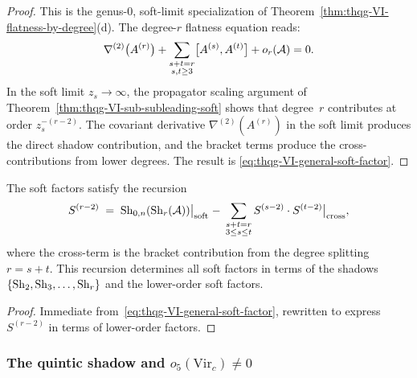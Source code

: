 \begin{proof}
This is the genus-$0$, soft-limit specialization of
Theorem~\ref{thm:thqg-VI-flatness-by-degree}(d). The degree-$r$
flatness equation reads:
\[
\nabla^{(2)}\bigl(A^{(r)}\bigr)
+ \sum_{\substack{s+t=r \\ s,t \geq 3}}
\bigl[A^{(s)}, A^{(t)}\bigr]
+ o_r(\mathcal{A})
= 0.
\]
In the soft limit $z_s \to \infty$, the propagator scaling argument
of Theorem~\ref{thm:thqg-VI-sub-subleading-soft} shows that
degree~$r$ contributes at order $z_s^{-(r-2)}$. The covariant
derivative $\nabla^{(2)}(A^{(r)})$ in the soft limit produces the
direct shadow contribution, and the bracket terms produce the
cross-contributions from lower degrees. The result is
\eqref{eq:thqg-VI-general-soft-factor}.
\end{proof}

\begin{corollary}
\label{cor:thqg-VI-soft-recursion}
The soft factors satisfy the recursion
\begin{equation}\label{eq:thqg-VI-soft-recursion}
S^{(r-2)}
\;=\;
\operatorname{Sh}_{0,n}(\operatorname{Sh}_r(\mathcal{A}))\bigl|_{\text{soft}}
\;-\;
\sum_{\substack{s+t=r \\ 3 \leq s \leq t}}
S^{(s-2)} \cdot S^{(t-2)}\bigl|_{\text{cross}},
\end{equation}
where the cross-term is the bracket contribution from the degree
splitting $r = s + t$. This recursion determines all soft factors
in terms of the shadows $\{\operatorname{Sh}_2, \operatorname{Sh}_3, \dotsc, \operatorname{Sh}_r\}$ and
the lower-order soft factors.
\end{corollary}

\begin{proof}
Immediate from~\eqref{eq:thqg-VI-general-soft-factor}, rewritten
to express $S^{(r-2)}$ in terms of lower-order factors.
\end{proof}

\subsubsection{The quintic shadow and $o_5(\mathrm{Vir}_c) \neq 0$}

